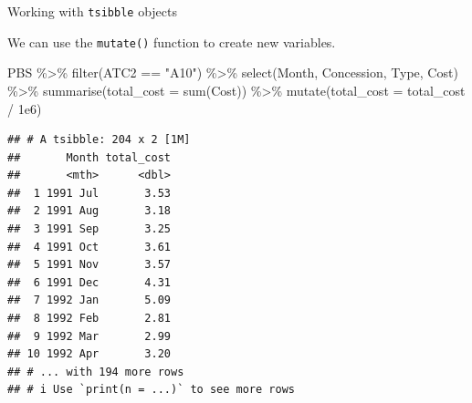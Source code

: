 \documentclass[14pt,ignorenonframetext,aspectratio=169]{beamer}
\newenvironment{Shaded}{\begin{snugshade}}{\end{snugshade}}
\newcommand{\AttributeTok}[1]{\textcolor[rgb]{0.77,0.63,0.00}{#1}}
\newcommand{\FloatTok}[1]{\textcolor[rgb]{0.00,0.00,0.81}{#1}}
\newcommand{\FunctionTok}[1]{\textcolor[rgb]{0.00,0.00,0.00}{#1}}
\newcommand{\NormalTok}[1]{#1}
\newcommand{\SpecialCharTok}[1]{\textcolor[rgb]{0.00,0.00,0.00}{#1}}
\newcommand{\StringTok}[1]{\textcolor[rgb]{0.31,0.60,0.02}{#1}}
\renewenvironment{Shaded}{\color{black}\begin{snugshade}\color{black}}{\end{snugshade}}
\renewenvironment{Shaded}{\color{black}\fontsize{10}{10}\sf\begin{snugshade}\color{black}}{\end{snugshade}}
\begin{document}
\begin{frame}[fragile]{Working with \texttt{tsibble} objects}
\protect\hypertarget{working-with-tsibble-objects-4}{}
\fontsize{12}{14}\sf

We can use the \texttt{mutate()} function to create new variables.

\fontsize{8}{10}\sf

\begin{Shaded}
\begin{Highlighting}[]
\NormalTok{PBS }\SpecialCharTok{\%\textgreater{}\%}
  \FunctionTok{filter}\NormalTok{(ATC2 }\SpecialCharTok{==} \StringTok{"A10"}\NormalTok{) }\SpecialCharTok{\%\textgreater{}\%}
  \FunctionTok{select}\NormalTok{(Month, Concession, Type, Cost) }\SpecialCharTok{\%\textgreater{}\%}
  \FunctionTok{summarise}\NormalTok{(}\AttributeTok{total\_cost =} \FunctionTok{sum}\NormalTok{(Cost)) }\SpecialCharTok{\%\textgreater{}\%}
  \FunctionTok{mutate}\NormalTok{(}\AttributeTok{total\_cost =}\NormalTok{ total\_cost }\SpecialCharTok{/} \FloatTok{1e6}\NormalTok{)}
\end{Highlighting}
\end{Shaded}

\begin{verbatim}
## # A tsibble: 204 x 2 [1M]
##       Month total_cost
##       <mth>      <dbl>
##  1 1991 Jul       3.53
##  2 1991 Aug       3.18
##  3 1991 Sep       3.25
##  4 1991 Oct       3.61
##  5 1991 Nov       3.57
##  6 1991 Dec       4.31
##  7 1992 Jan       5.09
##  8 1992 Feb       2.81
##  9 1992 Mar       2.99
## 10 1992 Apr       3.20
## # ... with 194 more rows
## # i Use `print(n = ...)` to see more rows
\end{verbatim}
\end{frame}
\end{document}
